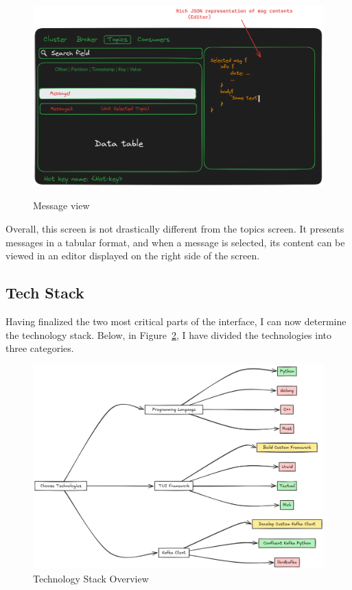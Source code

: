 \documentclass[10pt , a4paper]{report}
\begin{document}
\begin{figure}[htbp]
    \centering
    \includegraphics[width=.8\linewidth]{imgs/MessageView.png}
    \label{fig:message_view}
    \caption{Message view}
\end{figure}

Overall, this screen is not drastically different from the topics screen. It presents messages in a tabular format, and when a message is selected, its content can be viewed in an editor displayed on the right side of the screen.

\newpage
\subsection{Tech Stack}

Having finalized the two most critical parts of the interface, I can now determine the technology stack. Below, in Figure~\ref{fig:tech_chart}, I have divided the technologies into three categories.

\begin{figure}[htbp]
    \centering
    \includegraphics[width=.8\linewidth]{imgs/TechDiagram.png}
    \caption{Technology Stack Overview}
    \label{fig:tech_chart}
\end{figure}
\end{document}
